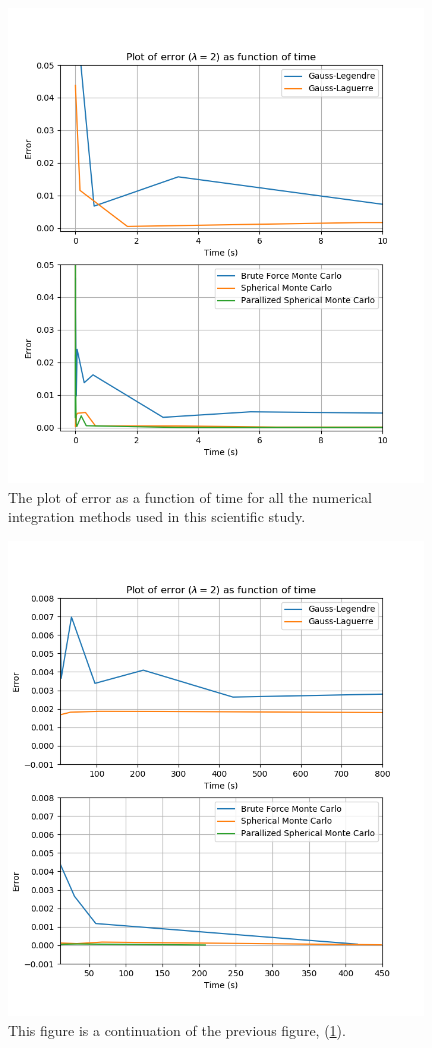 \documentclass{article}
\begin{document}
\begin{figure}[ht]
\centering
\includegraphics[width = 11cm]{images/method-timings-small.png}
\caption{The plot of error as a function of time for all the numerical integration methods used in this scientific study. }
\label{fig:timingssmallpng}
\end{figure}

\begin{figure}[ht]
\centering
\includegraphics[width = 11cm]{images/method-timings-large.png}
\caption{This figure is a continuation of the previous figure, (\ref{fig:timingssmallpng}). }
\label{fig:timingslargepng}
\end{figure}
\end{document}
